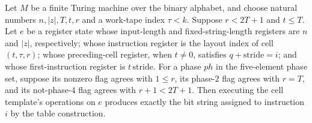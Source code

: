 \begin{theorem}
\label{Complexity.UTab.cell_bits}
\leanok
{}
Let $M$ be a finite Turing machine over the binary alphabet, and choose natural numbers
$n,|z|,T,t,r$ and a work-tape index $\tau<k$. Suppose $r<2T+1$ and $t\le T$. Let $e$ be
a register state whose input-length and fixed-string-length registers are $n$ and $|z|$,
respectively; whose instruction register is the layout index of cell $(t,\tau,r)$; whose
preceding-cell register, when $t\ne0$, satisfies $q+\mathrm{stride}=i$; and whose
first-instruction register is $t\,\mathrm{stride}$. For a phase $ph$ in the five-element
phase set, suppose its nonzero flag agrees with $1\le r$, its phase-$2$ flag agrees with
$r=T$, and its not-phase-$4$ flag agrees with $r+1<2T+1$. Then executing the cell
template’s operations on $e$ produces exactly the bit string assigned to instruction $i$
by the table construction.
\end{theorem}

